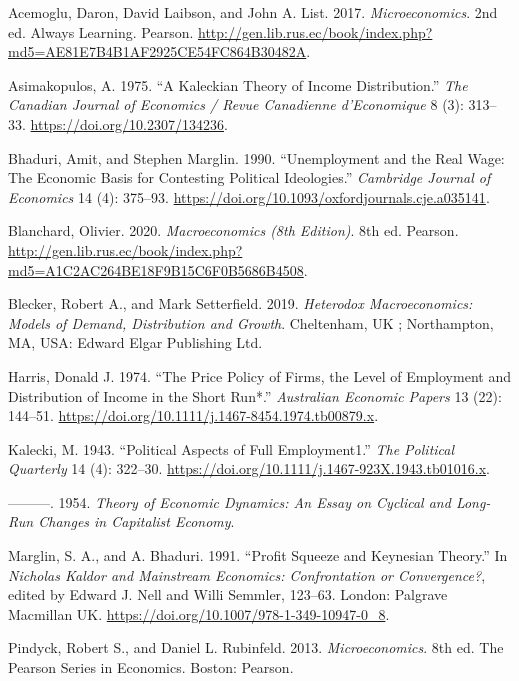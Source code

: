 \documentclass[
  letterpaper,
  DIV=11,
  numbers=noendperiod]{scrreprt}
\newlength{\cslhangindent}
\newlength{\cslentryspacingunit} %
\newenvironment{CSLReferences}[2] %
 {%
  \setlength{\parindent}{0pt}
  \ifodd #1
  \let\oldpar\par
  \def\par{\hangindent=\cslhangindent\oldpar}
  \fi
  \setlength{\parskip}{#2\cslentryspacingunit}
 }%
 {}
\begin{document}

\hypertarget{refs}{}
\begin{CSLReferences}{1}{0}
\leavevmode{}%
Acemoglu, Daron, David Laibson, and John A. List. 2017.
\emph{Microeconomics}. 2nd ed. Always Learning. Pearson.
\url{http://gen.lib.rus.ec/book/index.php?md5=AE81E7B4B1AF2925CE54FC864B30482A}.

\leavevmode{}%
Asimakopulos, A. 1975. {``A Kaleckian Theory of Income Distribution.''}
\emph{The Canadian Journal of Economics / Revue Canadienne d'Economique}
8 (3): 313--33. \url{https://doi.org/10.2307/134236}.

\leavevmode{}%
Bhaduri, Amit, and Stephen Marglin. 1990. {``Unemployment and the Real
Wage: The Economic Basis for Contesting Political Ideologies.''}
\emph{Cambridge Journal of Economics} 14 (4): 375--93.
\url{https://doi.org/10.1093/oxfordjournals.cje.a035141}.

\leavevmode{}%
Blanchard, Olivier. 2020. \emph{Macroeconomics (8th Edition)}. 8th ed.
Pearson.
\url{http://gen.lib.rus.ec/book/index.php?md5=A1C2AC264BE18F9B15C6F0B5686B4508}.

\leavevmode{}%
Blecker, Robert A., and Mark Setterfield. 2019. \emph{Heterodox
Macroeconomics: Models of Demand, Distribution and Growth}. Cheltenham,
{UK} ; Northampton, {MA}, {USA}: Edward Elgar Publishing Ltd.

\leavevmode{}%
Harris, Donald J. 1974. {``The Price Policy of Firms, the Level of
Employment and Distribution of Income in the Short Run*.''}
\emph{Australian Economic Papers} 13 (22): 144--51.
\url{https://doi.org/10.1111/j.1467-8454.1974.tb00879.x}.

\leavevmode{}%
Kalecki, M. 1943. {``Political Aspects of Full Employment1.''} \emph{The
Political Quarterly} 14 (4): 322--30.
\url{https://doi.org/10.1111/j.1467-923X.1943.tb01016.x}.

\leavevmode{}%
---------. 1954. \emph{Theory of Economic Dynamics: An Essay on Cyclical
and Long-Run Changes in Capitalist Economy}.

\leavevmode{}%
Marglin, S. A., and A. Bhaduri. 1991. {``Profit Squeeze and Keynesian
Theory.''} In \emph{Nicholas Kaldor and Mainstream Economics:
Confrontation or Convergence?}, edited by Edward J. Nell and Willi
Semmler, 123--63. London: Palgrave Macmillan {UK}.
\url{https://doi.org/10.1007/978-1-349-10947-0_8}.

\leavevmode{}%
Pindyck, Robert S., and Daniel L. Rubinfeld. 2013.
\emph{Microeconomics}. 8th ed. The Pearson Series in Economics. Boston:
Pearson.

\end{CSLReferences}
\end{document}
